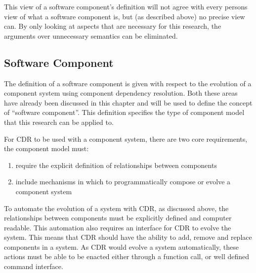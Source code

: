 This view of a software component's definition will not agree with every persons view of what a software component is, but (as described above) no precise view can.
By only looking at aspects that are necessary for this research, the arguments over unnecessary semantics can be eliminated. 

\subsection{Software Component}
The definition of a software component is given with respect to the evolution of a component system using component dependency resolution.
Both these areas have already been discussed in this chapter and will be used to define the concept of ``software component''.
This definition specifies the type of component model that this research can be applied to.

For CDR to be used with a component system, there are two core requirements, the component model must:
\begin{enumerate}
  \item require the explicit definition of relationships between components
  \item include mechanisms in which to programmatically compose or evolve a component system
\end{enumerate}
To automate the evolution of a system with CDR, as discussed above, the relationships between components must be explicitly defined and computer readable.
This automation also requires an interface for CDR to evolve the system.
This means that CDR should have the ability to add, remove and replace components in a system.
As CDR would evolve a system automatically, these actions must be able to be enacted either through a function call, or well defined command interface.

